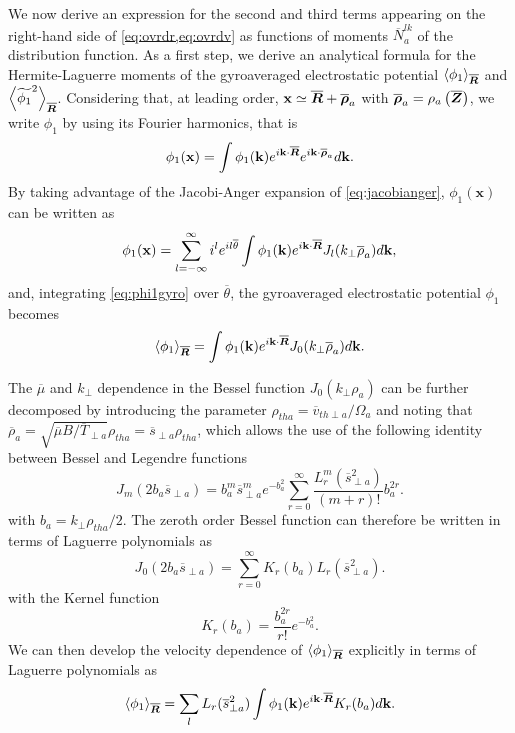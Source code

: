 We now derive an expression for the second and third terms appearing on the right-hand side of \cref{eq:ovrdr,eq:ovrdv} as functions of moments $\overline N_a^{lk}$ of the distribution function.
%
As a first step, we derive an analytical formula for the Hermite-Laguerre moments of the gyroaveraged electrostatic potential $\left< \phi_1 \right>_{\overline{\bm{R}}}$ and $\left< \widetilde{\phi_1}^2 \right>_{\overline{\bm{R}}}$.
%
Considering that, at leading order, $\mathbf x \simeq \overline{\bm{R}}+\overline{\bm{\rho}}_a$ with $\overline{\bm{\rho}}_a=\mathbf \rho_a\left(\overline{\bm{Z}}\right)$, we write $\phi_1$ by using its Fourier harmonics, that is
%
\begin{equation}
    \phi_1(\mathbf x) = \int \phi_1(\mathbf k)e^{i \mathbf k \cdot \overline{\bm{R}}}e^{i \mathbf k \cdot \overline{\bm{\rho}}_a} d \mathbf k.
\end{equation}
%
By taking advantage of the Jacobi-Anger expansion of \cref{eq:jacobianger}, $\phi_1(\mathbf x)$ can be written as
%
\begin{equation}
    \phi_1(\mathbf x) = \sum_{l=-\infty}^{\infty} i^l e^{i l \overline \theta} \int \phi_1(\mathbf k)e^{i \mathbf k \cdot \overline{\bm{R}}}J_l(k_\perp \overline \rho_a) d \mathbf k,
\label{eq:phi1gyro}
\end{equation}
%
and, integrating \cref{eq:phi1gyro} over $\overline \theta$, the gyroaveraged electrostatic potential $\phi_1$ becomes
%
\begin{equation}
    \left<\phi_1\right>_{\overline{\bm{R}}} = \int \phi_1(\mathbf k)e^{i \mathbf k \cdot \overline{\bm{R}}}J_0(k_\perp \overline \rho_a) d \mathbf k.
\label{eq:phi1gyro1}
\end{equation}

The $\overline \mu$ and $k_\perp$ dependence in the Bessel function $J_0(k_\perp \rho_a)$ can be further decomposed by introducing the parameter $\rho_{tha} = \overline v_{th\perp a}/\Omega_a$ and noting that $\overline \rho_a = \sqrt{\overline \mu B/\overline T_{\perp a}} \rho_{tha}=\overline s_{\perp a} \rho_{tha}$, which allows the use of the following identity between Bessel and Legendre functions \citep{Zwillinger2014}
%
\begin{equation}
    J_m(2 b_a \overline s_{\perp a}) = b_a^m \overline s_{\perp a}^{m}e^{-b_a^2}\sum_{r=0}^\infty \frac{L_r^m(\overline s_{\perp a}^2)}{(m+r)!}b_a^{2r}.
\label{eq:bessLeg}
\end{equation}
%
with $b_a=k_\perp \rho_{tha}/2$.
%
The zeroth order Bessel function can therefore be written in terms of Laguerre polynomials as
%
\begin{equation}
    J_0(2 b_a \overline s_{\perp a}) = \sum_{r=0}^\infty {K}_r(b_a){L_r(\overline s_{\perp a}^2)}.
\label{eq:besslag0}
\end{equation}
%
with the Kernel function
%
\begin{equation}
    {K}_r(b_a)=\frac{b_a^{2r}}{r!}e^{-b_a^2}.
\end{equation}
%
We can then develop the velocity dependence of $\left<\phi_1\right>_{\overline{\bm{R}}}$ explicitly in terms of Laguerre polynomials as
%
\begin{equation}
    \left<\phi_1\right>_{\overline{\bm{R}}} = \sum_l L_r (\overline s_{\perp a}^2) \int \phi_1(\mathbf k)e^{i \mathbf k \cdot \overline{\bm{R}}}{K}_r(b_a) d \mathbf k.
\label{eq:phi1gyro2}
\end{equation}

